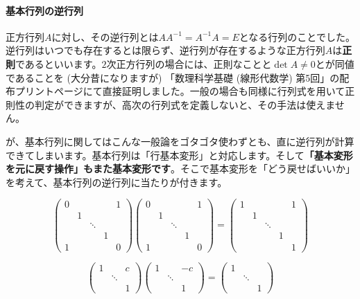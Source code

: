 \paragraph{基本行列の逆行列}

正方行列$A$に対し、その逆行列とは$AA^{-1} = A^{-1}A = E$となる行列のことでした。逆行列はいつでも存在するとは限らず、逆行列が存在するような正方行列$A$は\textbf{正則}であるといいます。$2$次正方行列の場合には、正則なことと$\det A \neq 0$とが同値であることを (大分昔になりますが) 「数理科学基礎 (線形代数学) 第5回」の配布プリント\pageref{paragraph:existence_of_inverse_matrix}ページにて直接証明しました。一般の場合も同様に行列式を用いて正則性の判定ができますが、高次の行列式を定義しないと、その手法は使えません。

が、基本行列に関してはこんな一般論をゴタゴタ使わずとも、直に逆行列が計算できてしまいます。基本行列は「行基本変形」と対応します。そして\textbf{「基本変形を元に戻す操作」もまた基本変形です}。そこで基本変形を「どう戻せばいいか」を考えて、基本行列の逆行列に当たりが付きます。

\[
\begin{pmatrix}
0 & & & & 1 \\
& 1 & & \\
& & \ddots & \\
& & & 1 \\
1 & & & & 0
\end{pmatrix}
\begin{pmatrix}
0 & & & & 1 \\
& 1 & & \\
& & \ddots & \\
& & & 1 \\
1 & & & & 0
\end{pmatrix}
=
\begin{pmatrix}
1 & & & & 1 \\
& 1 & & \\
& & \ddots & \\
& & & 1 \\
& & & & 1
\end{pmatrix}
\]

\[
\begin{pmatrix}
1 & & c \\
 & \ddots & \\
 & & 1
\end{pmatrix}
\begin{pmatrix}
1 & & -c \\
 & \ddots & \\
 & & 1
\end{pmatrix}
=
\begin{pmatrix}
1 & & \\
 & \ddots & \\
 & & 1
\end{pmatrix}
\]

